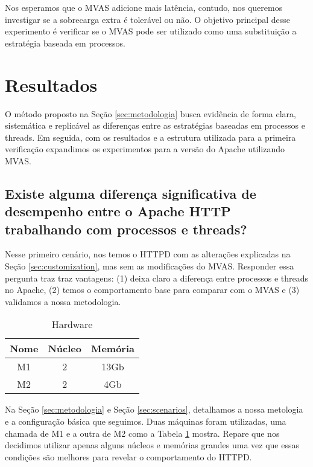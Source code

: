 

Nos esperamos que o MVAS adicione mais latência, contudo, nos queremos
investigar se a sobrecarga extra é tolerável ou não. O objetivo principal desse
experimento é verificar se o MVAS pode ser utilizado como uma substituição a
estratégia baseada em processos.

\section{Resultados}
\label{sec:preliminary}

O método proposto na Seção \ref{sec:metodologia} busca evidência de forma
clara, sistemática e replicável as diferenças entre as estratégias baseadas em
processos e threads. Em seguida, com os resultados e a estrutura utilizada para
a primeira verificação expandimos os experimentos para a versão do Apache
utilizando MVAS.

\subsection{Existe alguma diferença significativa de desempenho entre o Apache HTTP trabalhando com processos e threads?}

Nesse primeiro cenário, nos temos o HTTPD com as alterações explicadas na Seção
\ref{sec:customization}, mas sem as modificações do MVAS. Responder essa
pergunta traz traz vantagens: (1) deixa claro a diferença entre processos e
threads no Apache, (2) temos o comportamento base para comparar com o MVAS e
(3) validamos a nossa metodologia.

\begin{table}[h!]
  \centering
  \begin{tabular}{|c|c|c|}
    \hline
    Nome & \textbf{Núcleo} & \textbf{Memória}\\
    \hline
    M1 & 2 & 13Gb \\
    \hline
    M2 & 2 & 4Gb \\
    \hline
  \end{tabular}
  \caption{Hardware}
  \label{tab:machines}
\end{table}

Na Seção \ref{sec:metodologia} e Seção \ref{sec:scenarios}, detalhamos a nossa
metologia e a configuração básica que seguimos. Duas máquinas foram utilizadas,
uma chamada de M1 e a outra de M2 como a Tabela \ref{tab:machines} mostra.
Repare que nos decidimos utilizar apenas alguns núcleos e memórias grandes uma
vez que essas condições são melhores para revelar o comportamento do HTTPD.


